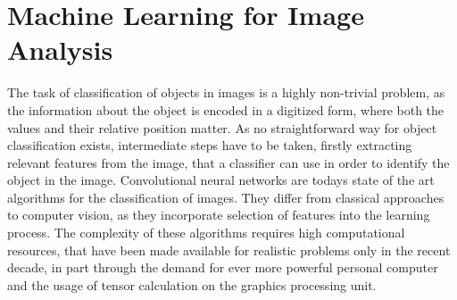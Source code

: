 
\chapter{Machine Learning for Image Analysis} %

\label{CNN} %

The task of classification of objects in images is a highly non-trivial problem, as the information about the object is encoded in a digitized form, where both the values and their relative position matter. As no straightforward way for object classification exists, intermediate steps have to be taken, firstly extracting relevant features from the image, that a classifier can use in order to identify the object in the image. Convolutional neural networks are todays state of the art algorithms for the classification of images. They differ from classical approaches to computer vision, as they incorporate selection of features into the learning process. The complexity of these algorithms requires high computational resources, that have been made available for realistic problems only in the recent decade, in part through the demand for ever more powerful personal computer and the usage of tensor calculation on the graphics processing unit. \\



